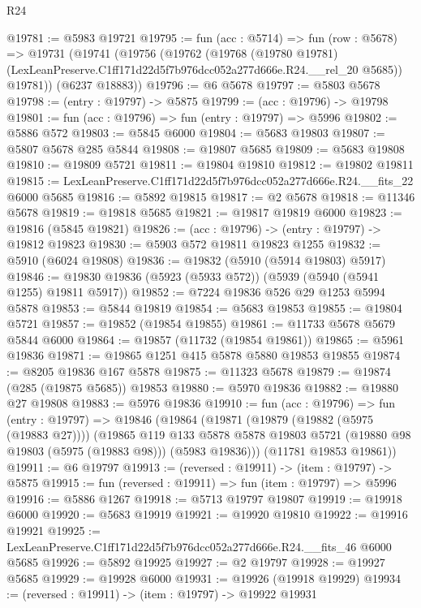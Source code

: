 \begin{lexlean}{R24}
\begin{coremodule}
@19781 := @5983 @19721
@19795 := fun (acc : @5714) =>
  fun (row : @5678) =>
  @19731
    (@19741
      (@19756
        (@19762
          (@19768
            (@19780 @19781)
            (LexLeanPreserve.C1ff171d22d5f7b976dcc052a277d666e.R24.__rel_20 @5685))
          @19781))
      (@6237 @18883))
@19796 := @6 @5678
@19797 := @5803 @5678
@19798 := (entry : @19797) -> @5875
@19799 := (acc : @19796) -> @19798
@19801 := fun (acc : @19796) => fun (entry : @19797) => @5996
@19802 := @5886 @572
@19803 := @5845 @6000
@19804 := @5683 @19803
@19807 := @5807 @5678 @285 @5844
@19808 := @19807 @5685
@19809 := @5683 @19808
@19810 := @19809 @5721
@19811 := @19804 @19810
@19812 := @19802 @19811
@19815 := LexLeanPreserve.C1ff171d22d5f7b976dcc052a277d666e.R24.__fits_22 @6000 @5685
@19816 := @5892 @19815
@19817 := @2 @5678
@19818 := @11346 @5678
@19819 := @19818 @5685
@19821 := @19817 @19819 @6000
@19823 := @19816 (@5845 @19821)
@19826 := (acc : @19796) -> (entry : @19797) -> @19812 @19823
@19830 := @5903 @572 @19811 @19823 @1255
@19832 := @5910 (@6024 @19808)
@19836 := @19832 (@5910 (@5914 @19803) @5917)
@19846 := @19830 @19836 (@5923 (@5933 @572)) (@5939 (@5940 (@5941 @1255) @19811 @5917))
@19852 := @7224 @19836 @526 @29 @1253 @5994 @5878
@19853 := @5844 @19819
@19854 := @5683 @19853
@19855 := @19804 @5721
@19857 := @19852 (@19854 @19855)
@19861 := @11733 @5678 @5679 @5844 @6000
@19864 := @19857 (@11732 (@19854 @19861))
@19865 := @5961 @19836
@19871 := @19865 @1251 @415 @5878 @5880 @19853 @19855
@19874 := @8205 @19836 @167 @5878
@19875 := @11323 @5678
@19879 := @19874 (@285 (@19875 @5685)) @19853
@19880 := @5970 @19836
@19882 := @19880 @27 @19808
@19883 := @5976 @19836
@19910 := fun (acc : @19796) =>
  fun (entry : @19797) =>
  @19846
    (@19864
      (@19871
        (@19879 (@19882 (@5975 (@19883 @27))))
        (@19865
          @119
          @133
          @5878
          @5878
          @19803
          @5721
          (@19880 @98 @19803 (@5975 (@19883 @98)))
          (@5983 @19836)))
      (@11781 @19853 @19861))
@19911 := @6 @19797
@19913 := (reversed : @19911) -> (item : @19797) -> @5875
@19915 := fun (reversed : @19911) => fun (item : @19797) => @5996
@19916 := @5886 @1267
@19918 := @5713 @19797 @19807
@19919 := @19918 @6000
@19920 := @5683 @19919
@19921 := @19920 @19810
@19922 := @19916 @19921
@19925 := LexLeanPreserve.C1ff171d22d5f7b976dcc052a277d666e.R24.__fits_46 @6000 @5685
@19926 := @5892 @19925
@19927 := @2 @19797
@19928 := @19927 @5685
@19929 := @19928 @6000
@19931 := @19926 (@19918 @19929)
@19934 := (reversed : @19911) -> (item : @19797) -> @19922 @19931

\end{coremodule}
\end{lexlean}
